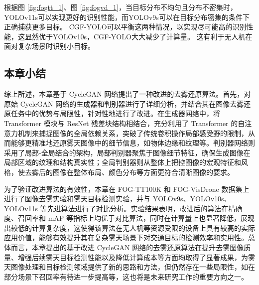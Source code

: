 根据图 \ref{fig:fogtt_1}、图 \ref{fig:fogvd_1}，当目标分布不均匀且分布不密集时，YOLOv11s可以实现更好的识别性能，而YOLOv9s可以在目标分布密集的条件下正确捕获更多目标。 CGF-YOLO可以平衡这两种情况，以实现尽可能高的识别性能，这显然优于YOLOv10s，CGF-YOLO大大减少了计算量。 这有利于无人机在面对复杂场景时识别小目标。

\subsection{本章小结}

综上所述，本章基于 CycleGAN 网络提出了一种改进的去雾还原算法。首先，对原始 CycleGAN 网络的生成器和判别器进行了详细分析，并结合其在图像去雾还原任务中的优势与局限性，针对性地进行了改进。在生成器网络中，将 Transformer 模块与 ResNet 残差块结构相结合，充分利用了 Transformer 的自注意力机制来捕捉图像的全局依赖关系，突破了传统卷积操作局部感受野的限制，从而能够更精准地还原雾天图像中的细节信息，如物体边缘和纹理等。判别器网络则采用了局部-全局结合的架构，局部判别器聚焦于图像细节特征，确保生成图像在局部区域的纹理和结构真实性；全局判别器则从整体上把控图像的宏观特征和风格，使去雾后的图像在整体布局、颜色分布等方面更符合清晰图像的要求。

为了验证改进算法的有效性，本章在 FOG-TT100K 和 FOG-VisDrone 数据集上进行了图像去雾实验和雾天目标检测实验，并与 YOLOv9s、YOLOv10s、YOLOv11s 等先进算法进行了对比分析。实验结果表明，改进后的算法在精确度、召回率和 mAP 等指标上均优于对比算法，同时在计算量上也显著降低，展现出较低的计算复杂度，这使得该算法在无人机等资源受限的设备上具有较高的实际应用价值，能够有效提升其在复杂雾天场景下对交通目标的检测效率和实用性。总体而言，本章提出的基于改进 CycleGAN 网络的去雾还原算法在提升去雾图像质量、增强后续雾天目标检测性能以及降低计算成本等方面均取得了显著成果，为雾天图像处理和目标检测领域提供了新的思路和方法，但仍然存在一些局限性，如在部分场景下召回率有待进一步提高等，这也将是未来研究工作的重要方向之一。
